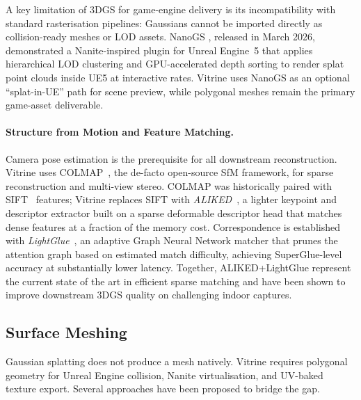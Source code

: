 A key limitation of 3DGS for game-engine delivery is its incompatibility with
standard rasterisation pipelines: Gaussians cannot be imported directly as
collision-ready meshes or LOD assets.  NanoGS \cite{nanogs2026}, released in March
2026, demonstrated a Nanite-inspired plugin for Unreal Engine~5 that applies
hierarchical LOD clustering and GPU-accelerated depth sorting to render splat point
clouds inside UE5 at interactive rates.  Vitrine uses NanoGS as an optional
``splat-in-UE'' path for scene preview, while polygonal meshes remain the primary
game-asset deliverable.

\paragraph{Structure from Motion and Feature Matching.}
Camera pose estimation is the prerequisite for all downstream reconstruction.
Vitrine uses COLMAP~\cite{schoenberger2016sfm, schoenberger2016mvs}, the de-facto
open-source SfM framework, for sparse reconstruction and multi-view stereo.  COLMAP
was historically paired with SIFT~\cite{lowe2004_sift} features; Vitrine replaces
SIFT with \emph{ALIKED}~\cite{zhao2023_aliked}, a lighter keypoint and descriptor
extractor built on a sparse deformable descriptor head that matches dense features
at a fraction of the memory cost.  Correspondence is established with
\emph{LightGlue}~\cite{lindenberger2023_lightglue}, an adaptive Graph Neural
Network matcher that prunes the attention graph based on estimated match difficulty,
achieving SuperGlue-level accuracy at substantially lower latency.  Together,
ALIKED+LightGlue represent the current state of the art in efficient
sparse matching and have been shown to improve downstream 3DGS quality on
challenging indoor captures.

\subsection{Surface Meshing}
\label{sec:tech:meshing}

Gaussian splatting does not produce a mesh natively.  Vitrine requires polygonal
geometry for Unreal Engine collision, Nanite virtualisation, and UV-baked texture
export.  Several approaches have been proposed to bridge the gap.

